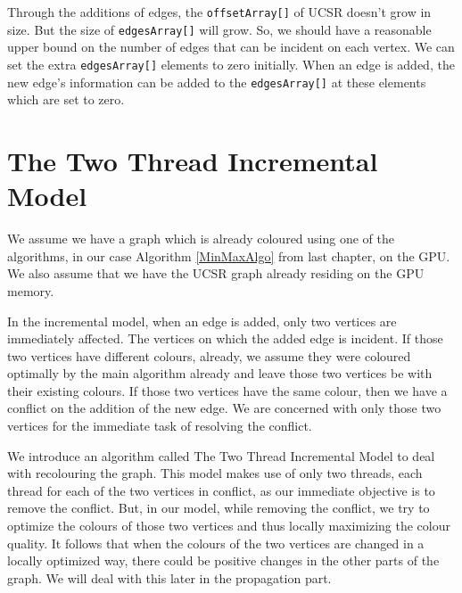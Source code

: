 \documentclass[MTech]{iitmdiss}
\begin{document}
Through the additions of edges, the \verb+offsetArray[]+ of UCSR doesn't grow in size. But the size of \verb+edgesArray[]+ will grow. So, we should have a reasonable upper bound on the number of edges that can be incident on each vertex. We can set the extra \verb+edgesArray[]+ elements to zero initially. When an edge is added, the new edge's information can be added to the \verb+edgesArray[]+ at these elements which are set to zero.

\section{The Two Thread Incremental Model}
We assume we have a graph which is already coloured using one of the algorithms, in our case Algorithm \ref{MinMaxAlgo} from last chapter, on the GPU. We also assume that we have the UCSR graph already residing on the GPU memory. 

In the incremental model, when an edge is added, only two vertices are immediately affected. The vertices on which the added edge is incident. If those two vertices have different colours, already, we assume they were coloured optimally by the main algorithm already and leave those two vertices be with their existing colours. If those two vertices have the same colour, then we have a conflict on the addition of the new edge. We are concerned with only those two vertices for the immediate task of resolving the conflict.

We introduce an algorithm called The Two Thread Incremental Model to deal with recolouring the graph. This model makes use of only two threads, each thread for each of the two vertices in conflict, as our immediate objective is to remove the conflict. But, in our model, while removing the conflict, we try to optimize the colours of those two vertices and thus locally maximizing the colour quality. It follows that when the colours of the two vertices are changed in a locally optimized way, there could be positive changes in the other parts of the graph. We will deal with this later in the propagation part.
\end{document}
